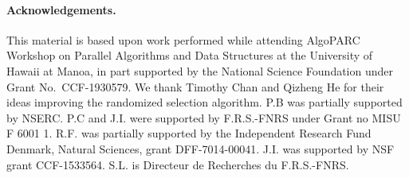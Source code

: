 \documentclass[runningheads]{llncs}
\begin{document}
%
%
%








\paragraph{Acknowledgements.} 
\begin{small}
This material is based upon work performed while attending AlgoPARC Workshop on Parallel Algorithms and Data Structures at the University of Hawaii at Manoa, in part supported by the National Science Foundation under Grant No.~CCF-1930579. We thank Timothy Chan and Qizheng He for their ideas improving the randomized selection algorithm. P.B was partially supported by NSERC. P.C and J.I. were supported by F.R.S.-FNRS under Grant no MISU F 6001 1. R.F. was partially supported by the Independent Research Fund Denmark, Natural Sciences, grant DFF-7014-00041. J.I. was supported by NSF grant CCF-1533564. S.L. is Directeur de Recherches du F.R.S.-FNRS.
\end{small}



\end{document}
